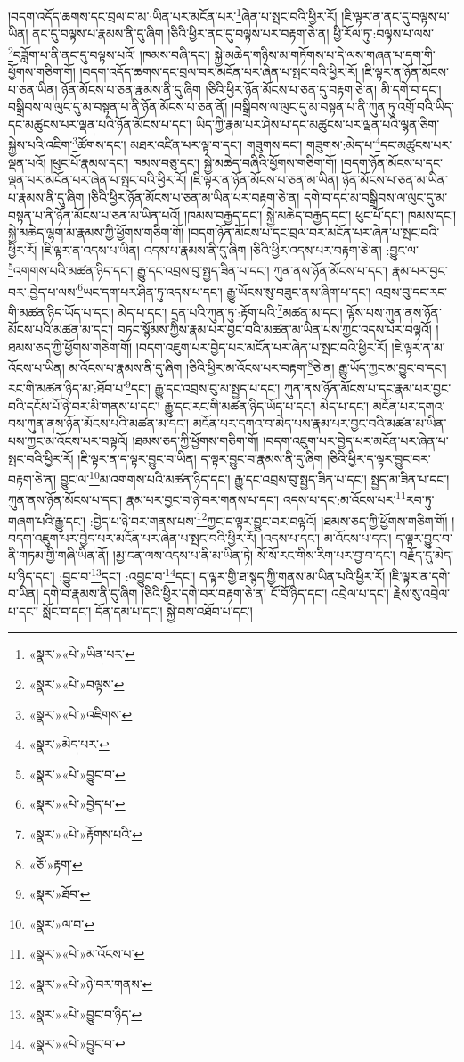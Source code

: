།བདག་འདོད་ཆགས་དང་བྲལ་བ་མ་:ཡིན་པར་མངོན་པར་\footnote{«སྣར་»«པེ་»ཡིན་པར་}ཞེན་པ་སྤང་བའི་ཕྱིར་རོ། །ཇི་ལྟར་ན་ནང་དུ་བལྟས་པ་ཡིན། ནང་དུ་བལྟས་པ་རྣམས་ནི་དུ་ཞིག །ཅིའི་ཕྱིར་ནང་དུ་བལྟས་པར་བརྟག་ཅེ་ན། ཕྱི་རོལ་ཏུ་:བལྟས་པ་ལས་\footnote{«སྣར་»«པེ་»བལྟས་}བཟློག་པ་ནི་ནང་དུ་བལྟས་པའོ། །ཁམས་བཞི་དང་། སྐྱེ་མཆེད་གཉིས་མ་གཏོགས་པ་དེ་ལས་གཞན་པ་དག་གི་ཕྱོགས་གཅིག་གོ། །བདག་འདོད་ཆགས་དང་བྲལ་བར་མངོན་པར་ཞེན་པ་སྤང་བའི་ཕྱིར་རོ། །ཇི་ལྟར་ན་ཉོན་མོངས་པ་ཅན་ཡིན། ཉོན་མོངས་པ་ཅན་རྣམས་ནི་དུ་ཞིག །ཅིའི་ཕྱིར་ཉོན་མོངས་པ་ཅན་དུ་བརྟག་ཅེ་ན། མི་དགེ་བ་དང་། བསྒྲིབས་ལ་ལུང་དུ་མ་བསྟན་པ་ནི་ཉོན་མོངས་པ་ཅན་ནོ། །བསྒྲིབས་ལ་ལུང་དུ་མ་བསྟན་པ་ནི་ཀུན་ཏུ་འགྲོ་བའི་ཡིད་དང་མཚུངས་པར་ལྡན་པའི་ཉོན་མོངས་པ་དང་། ཡིད་ཀྱི་རྣམ་པར་ཤེས་པ་དང་མཚུངས་པར་ལྡན་པའི་ལྷན་ཅིག་སྐྱེས་པའི་འཇིག་\footnote{«སྣར་»«པེ་»འཇིགས་}ཚོགས་དང་། མཐར་འཛིན་པར་ལྟ་བ་དང་། གཟུགས་དང་། གཟུགས་:མེད་པ་\footnote{«སྣར་»མེད་པར་}དང་མཚུངས་པར་ལྡན་པའོ། །ཕུང་པོ་རྣམས་དང་། ཁམས་བཅུ་དང་། སྐྱེ་མཆེད་བཞིའི་ཕྱོགས་གཅིག་གོ། །བདག་ཉོན་མོངས་པ་དང་ལྡན་པར་མངོན་པར་ཞེན་པ་སྤང་བའི་ཕྱིར་རོ། །ཇི་ལྟར་ན་ཉོན་མོངས་པ་ཅན་མ་ཡིན། ཉོན་མོངས་པ་ཅན་མ་ཡིན་པ་རྣམས་ནི་དུ་ཞིག །ཅིའི་ཕྱིར་ཉོན་མོངས་པ་ཅན་མ་ཡིན་པར་བརྟག་ཅེ་ན། དགེ་བ་དང་མ་བསྒྲིབས་ལ་ལུང་དུ་མ་བསྟན་པ་ནི་ཉོན་མོངས་པ་ཅན་མ་ཡིན་པའོ། །ཁམས་བརྒྱད་དང་། སྐྱེ་མཆེད་བརྒྱད་དང་། ཕུང་པོ་དང་། ཁམས་དང་། སྐྱེ་མཆེད་ལྷག་མ་རྣམས་ཀྱི་ཕྱོགས་གཅིག་གོ། །བདག་ཉོན་མོངས་པ་དང་བྲལ་བར་མངོན་པར་ཞེན་པ་སྤང་བའི་ཕྱིར་རོ། །ཇི་ལྟར་ན་འདས་པ་ཡིན། འདས་པ་རྣམས་ནི་དུ་ཞིག །ཅིའི་ཕྱིར་འདས་པར་བརྟག་ཅེ་ན། :བྱུང་ལ་\footnote{«སྣར་»«པེ་»བྱུང་བ་}འགགས་པའི་མཚན་ཉིད་དང་། རྒྱུ་དང་འབྲས་བུ་སྤྱད་ཟིན་པ་དང་། ཀུན་ནས་ཉོན་མོངས་པ་དང་། རྣམ་པར་བྱང་བར་:བྱེད་པ་ལས་\footnote{«སྣར་»«པེ་»བྱེད་པ་}ཡང་དག་པར་ཤིན་ཏུ་འདས་པ་དང་། རྒྱུ་ཡོངས་སུ་བཟུང་ནས་ཞིག་པ་དང་། འབྲས་བུ་དང་རང་གི་མཚན་ཉིད་ཡོད་པ་དང་། མེད་པ་དང་། དྲན་པའི་ཀུན་ཏུ་:རྟོག་པའི་\footnote{«སྣར་»«པེ་»རྟོགས་པའི་}མཚན་མ་དང་། ལྟོས་པས་ཀུན་ནས་ཉོན་མོངས་པའི་མཚན་མ་དང་། བཏང་སྙོམས་ཀྱིས་རྣམ་པར་བྱང་བའི་མཚན་མ་ཡིན་པས་ཀྱང་འདས་པར་བལྟའོ། །ཐམས་ཅད་ཀྱི་ཕྱོགས་གཅིག་གོ། །བདག་འཇུག་པར་བྱེད་པར་མངོན་པར་ཞེན་པ་སྤང་བའི་ཕྱིར་རོ། །ཇི་ལྟར་ན་མ་འོངས་པ་ཡིན། མ་འོངས་པ་རྣམས་ནི་དུ་ཞིག །ཅིའི་ཕྱིར་མ་འོངས་པར་བརྟག་\footnote{«ཅོ་»རྟག་}ཅེ་ན། རྒྱུ་ཡོད་ཀྱང་མ་བྱུང་བ་དང་། རང་གི་མཚན་ཉིད་མ་:ཐོབ་པ་\footnote{«སྣར་»ཐོབ་}དང་། རྒྱུ་དང་འབྲས་བུ་མ་སྤྱད་པ་དང་། ཀུན་ནས་ཉོན་མོངས་པ་དང་རྣམ་པར་བྱང་བའི་དངོས་པོ་ཉེ་བར་མི་གནས་པ་དང་། རྒྱུ་དང་རང་གི་མཚན་ཉིད་ཡོད་པ་དང་། མེད་པ་དང་། མངོན་པར་དགའ་བས་ཀུན་ནས་ཉོན་མོངས་པའི་མཚན་མ་དང་། མངོན་པར་དགའ་བ་མེད་པས་རྣམ་པར་བྱང་བའི་མཚན་མ་ཡིན་པས་ཀྱང་མ་འོངས་པར་བལྟའོ། །ཐམས་ཅད་ཀྱི་ཕྱོགས་གཅིག་གོ། །བདག་འཇུག་པར་བྱེད་པར་མངོན་པར་ཞེན་པ་སྤང་བའི་ཕྱིར་རོ། །ཇི་ལྟར་ན་ད་ལྟར་བྱུང་བ་ཡིན། ད་ལྟར་བྱུང་བ་རྣམས་ནི་དུ་ཞིག །ཅིའི་ཕྱིར་ད་ལྟར་བྱུང་བར་བརྟག་ཅེ་ན། བྱུང་ལ་\footnote{«སྣར་»ལ་བ་}མ་འགགས་པའི་མཚན་ཉིད་དང་། རྒྱུ་དང་འབྲས་བུ་སྤྱད་ཟིན་པ་དང་། སྤྱད་མ་ཟིན་པ་དང་། ཀུན་ནས་ཉོན་མོངས་པ་དང་། རྣམ་པར་བྱང་བ་ཉེ་བར་གནས་པ་དང་། འདས་པ་དང་:མ་འོངས་པར་\footnote{«སྣར་»«པེ་»མ་འོངས་པ་}རབ་ཏུ་གཞག་པའི་རྒྱུ་དང་། :བྱེད་པ་ཉེ་བར་གནས་པས་\footnote{«སྣར་»«པེ་»ཉེ་བར་གནས་}ཀྱང་ད་ལྟར་བྱུང་བར་བལྟའོ། །ཐམས་ཅད་ཀྱི་ཕྱོགས་གཅིག་གོ། །བདག་འཇུག་པར་བྱེད་པར་མངོན་པར་ཞེན་པ་སྤང་བའི་ཕྱིར་རོ། །འདས་པ་དང་། མ་འོངས་པ་དང་། ད་ལྟར་བྱུང་བ་ནི་གཏམ་གྱི་གཞི་ཡིན་ནོ། །མྱ་ངན་ལས་འདས་པ་ནི་མ་ཡིན་ཏེ། སོ་སོ་རང་གིས་རིག་པར་བྱ་བ་དང་། བརྗོད་དུ་མེད་པ་ཉིད་དང་། :བྱུང་བ་\footnote{«སྣར་»«པེ་»བྱུང་བ་ཉིད་}དང་། :འབྱུང་བ་\footnote{«སྣར་»«པེ་»བྱུང་བ་}དང་། ད་ལྟར་གྱི་ཐ་སྙད་ཀྱི་གནས་མ་ཡིན་པའི་ཕྱིར་རོ། །ཇི་ལྟར་ན་དགེ་བ་ཡིན། དགེ་བ་རྣམས་ནི་དུ་ཞིག །ཅིའི་ཕྱིར་དགེ་བར་བརྟག་ཅེ་ན། ངོ་བོ་ཉིད་དང་། འབྲེལ་པ་དང་། རྗེས་སུ་འབྲེལ་པ་དང་། སློང་བ་དང་། དོན་དམ་པ་དང་། སྐྱེ་བས་འཐོབ་པ་དང་། 
